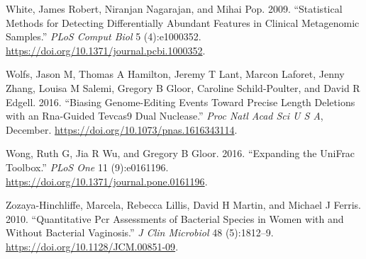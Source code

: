 \documentclass[onecolumn]{book}
\theoremstyle{definition}
\theoremstyle{definition}
\theoremstyle{definition}
\theoremstyle{remark}
\begin{document}
\leavevmode\hypertarget{ref-White:2009}{}%
White, James Robert, Niranjan Nagarajan, and Mihai Pop. 2009.
``Statistical Methods for Detecting Differentially Abundant Features in
Clinical Metagenomic Samples.'' \emph{PLoS Comput Biol} 5 (4):e1000352.
\url{https://doi.org/10.1371/journal.pcbi.1000352}.

\leavevmode\hypertarget{ref-Wolfs:2016aa}{}%
Wolfs, Jason M, Thomas A Hamilton, Jeremy T Lant, Marcon Laforet, Jenny
Zhang, Louisa M Salemi, Gregory B Gloor, Caroline Schild-Poulter, and
David R Edgell. 2016. ``Biasing Genome-Editing Events Toward Precise
Length Deletions with an Rna-Guided Tevcas9 Dual Nuclease.'' \emph{Proc
Natl Acad Sci U S A}, December.
\url{https://doi.org/10.1073/pnas.1616343114}.

\leavevmode\hypertarget{ref-Wong:2016aa}{}%
Wong, Ruth G, Jia R Wu, and Gregory B Gloor. 2016. ``Expanding the
UniFrac Toolbox.'' \emph{PLoS One} 11 (9):e0161196.
\url{https://doi.org/10.1371/journal.pone.0161196}.

\leavevmode\hypertarget{ref-Zozaya:2010}{}%
Zozaya-Hinchliffe, Marcela, Rebecca Lillis, David H Martin, and Michael
J Ferris. 2010. ``Quantitative Pcr Assessments of Bacterial Species in
Women with and Without Bacterial Vaginosis.'' \emph{J Clin Microbiol} 48
(5):1812--9. \url{https://doi.org/10.1128/JCM.00851-09}.
\end{document}
